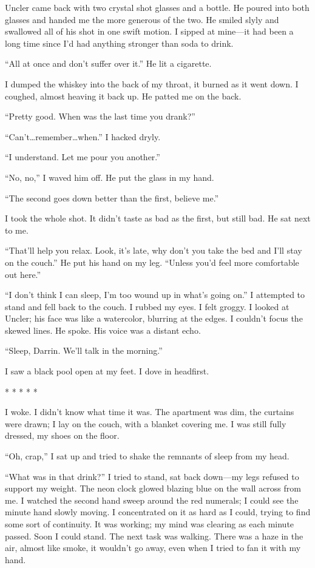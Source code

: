 Uncler came back with two crystal shot glasses and a bottle. He poured
into both glasses and handed me the more generous of the two. He smiled
slyly and swallowed all of his shot in one swift motion. I sipped at
mine---it had been a long time since I'd had anything stronger than soda
to drink.

``All at once and don't suffer over it.'' He lit a cigarette.

I dumped the whiskey into the back of my throat, it burned as it went
down. I coughed, almost heaving it back up. He patted me on the back.

``Pretty good. When was the last time you drank?''

``Can't\ldots remember\ldots when.'' I hacked dryly.

``I understand. Let me pour you another.''

``No, no,'' I waved him off. He put the glass in my hand.

``The second goes down better than the first, believe me.''

I took the whole shot. It didn't taste as bad as the first, but still
bad. He sat next to me.

``That'll help you relax. Look, it's late, why don't you take the bed
and I'll stay on the couch.'' He put his hand on my leg. ``Unless you'd
feel more comfortable out here.''

``I don't think I can sleep, I'm too wound up in what's going on.'' I
attempted to stand and fell back to the couch. I rubbed my eyes. I felt
groggy. I looked at Uncler; his face was like a watercolor, blurring at
the edges. I couldn't focus the skewed lines. He spoke. His voice was a
distant echo.

``Sleep, Darrin. We'll talk in the morning.''

I saw a black pool open at my feet. I dove in headfirst.

* * * * *

I woke. I didn't know what time it was. The apartment was dim, the
curtains were drawn; I lay on the couch, with a blanket covering me. I
was still fully dressed, my shoes on the floor.

``Oh, crap,'' I sat up and tried to shake the remnants of sleep from my
head.

``What was in that drink?'' I tried to stand, sat back down---my legs
refused to support my weight. The neon clock glowed blazing blue on the
wall across from me. I watched the second hand sweep around the red
numerals; I could see the minute hand slowly moving. I concentrated on
it as hard as I could, trying to find some sort of continuity. It was
working; my mind was clearing as each minute passed. Soon I could stand.
The next task was walking. There was a haze in the air, almost like
smoke, it wouldn't go away, even when I tried to fan it with my hand.

